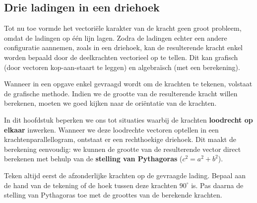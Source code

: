\documentclass{ximera}
\begin{document}

\subsection{Drie ladingen in een driehoek}
Tot nu toe vormde het vectoriële karakter van de kracht geen groot probleem, omdat de ladingen op één lijn lagen. Zodra de ladingen echter een andere configuratie aannemen, zoals in een driehoek, kan de resulterende kracht enkel worden bepaald door de deelkrachten vectorieel op te tellen. Dit kan grafisch (door vectoren kop-aan-staart te leggen) en algebraïsch (met een berekening).

Wanneer in een opgave enkel gevraagd wordt om de krachten te tekenen, volstaat de grafische methode. Indien we de grootte van de resulterende kracht willen berekenen, moeten we goed kijken naar de oriëntatie van de krachten. 

In dit hoofdstuk beperken we ons tot situaties waarbij de krachten \textbf{loodrecht op elkaar} inwerken. Wanneer we deze loodrechte vectoren optellen in een krachtenparallellogram, ontstaat er een rechthoekige driehoek. Dit maakt de berekening eenvoudig: we kunnen de grootte van de resulterende vector direct berekenen met behulp van de \textbf{stelling van Pythagoras} ($c^{2} = a^{2} + b^{2}$).

\begin{remark}[title={Stappenplan bij vectoren in 2D}]\nl
Teken altijd eerst de afzonderlijke krachten op de gevraagde lading. Bepaal aan de hand van de tekening of de hoek tussen deze krachten $90^\circ$ is. Pas daarna de stelling van Pythagoras toe met de groottes van de berekende krachten.
\end{remark}
\end{document}
